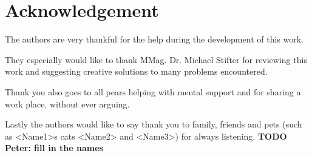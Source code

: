 \chapter{Acknowledgement}

The authors are very thankful for the help during the development of this work.


\vspace{5mm}
\noindent
They especially would like to thank MMag. Dr. Michael Stifter for reviewing this work and suggesting creative solutions to many problems encountered.

\vspace{5mm}
\noindent
Thank you also goes to all pears helping with mental support and for sharing a work place, without ever arguing.

\vspace{5mm}
\noindent
Lastly the authors would like to say thank you to family, friends and pets (such as <Name1>s cats <Name2> and <Name3>) for always listening.  \textbf{TODO Peter: fill in the names}

